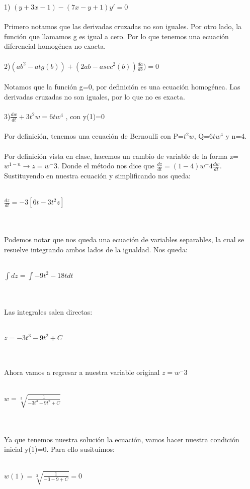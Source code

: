\documentclass[a4paper,10pt]{article}
\begin{document}
1) $(y+3x-1)- (7x-y+1)y'=0$\\\\
Primero notamos que las derivadas cruzadas no son iguales. Por otro lado, la función que llamamos g es igual a cero. Por lo que tenemos una ecuación diferencial homogénea no exacta.\\\\
2)$(ab^2 - atg(b)) + (2ab-asec^2 (b))\frac{da}{db})=0$\\\\
Notamos que la función g=0, por definición es una ecuación homogénea. Las derivadas cruzadas no son iguales, por lo que no es exacta.\\\\
3)$\frac{dw}{dt} + 3t^2 w = 6tw^4$ , con y(1)=0\\\\
Por definición, tenemos una ecuación de Bernoulli con P=$t^2w$, Q=$6tw^4$ y n=4.\\\\
Por definición vista en clase, hacemos un cambio de variable de la forma z=$w^{1-n} \rightarrow z=w^-3$. Donde el método nos dice que $\frac{dz}{dt} = (1-4)w^-4 \frac{dw}{dt}$. Sustituyendo en nuestra ecuación y simplificando nos queda:\\\\
\centerline{$\frac{dz}{dt} = -3[6t - 3t^2z]$}\\\\
Podemos notar que nos queda una ecuación de variables separables, la cual se resuelve integrando ambos lados de la igualdad. Nos queda:\\\\
\centerline{$\int dz = \int -9t^2 - 18t dt$}\\\\
Las integrales salen directas:\\\\
\centerline{$z = -3t^3 -9t^2  + C$ }\\\\
Ahora vamos a regresar a nuestra variable original $z=w^-3$\\\\
\centerline{$w= \sqrt[3]{\frac{1}{-3t^3 -9t^2  + C}}$}\\\\ 
Ya que tenemos nuestra solución la ecuación, vamos hacer nuestra condición inicial y(1)=0. Para ello susituímos:\\\\
\centerline{$w(1) = \sqrt[3]{\frac{1}{-3 -9  + C}} = 0$}\\\\
\end{document}
